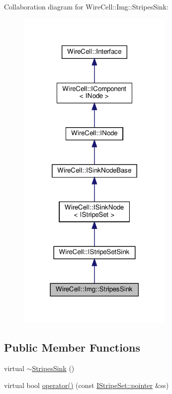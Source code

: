Collaboration diagram for Wire\+Cell\+:\+:Img\+:\+:Stripes\+Sink\+:
\nopagebreak
\begin{figure}[H]
\begin{center}
\leavevmode
\includegraphics[width=213pt]{class_wire_cell_1_1_img_1_1_stripes_sink__coll__graph}
\end{center}
\end{figure}
\subsection*{Public Member Functions}
\begin{DoxyCompactItemize}
\item 
virtual \hyperlink{class_wire_cell_1_1_img_1_1_stripes_sink_a2c6076d7d9e2fccb5cf726acbf195d2c}{$\sim$\+Stripes\+Sink} ()
\item 
virtual bool \hyperlink{class_wire_cell_1_1_img_1_1_stripes_sink_a6edd9ffaf1f315bacd8bcb0cfc7e5320}{operator()} (const \hyperlink{class_wire_cell_1_1_i_data_aff870b3ae8333cf9265941eef62498bc}{I\+Stripe\+Set\+::pointer} \&ss)
\end{DoxyCompactItemize}

